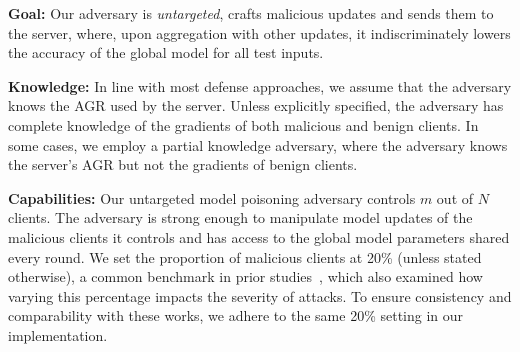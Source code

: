 \noindent\textbf{Goal:}
Our adversary is \emph{untargeted}, crafts malicious updates and sends them to the server, where, upon aggregation with other updates, it indiscriminately lowers the accuracy of the global model for all test inputs.



\noindent\textbf{Knowledge:} In line with most defense approaches, we assume that the adversary knows the AGR used by the server.
Unless explicitly specified, the adversary has complete knowledge of the gradients of both malicious and benign clients. In some cases, we employ a partial knowledge adversary, where the adversary knows the server's AGR but not the gradients of benign clients.

\noindent\textbf{Capabilities:} Our untargeted model poisoning adversary controls $m$ out of $N$ clients. The adversary is strong enough to manipulate model updates of the malicious clients it controls and has access to the global model parameters shared every round. 
We set the proportion of malicious clients at 20\% (unless stated otherwise), a common benchmark in prior studies~\cite{shejwalkar2021manipulating, fang2020local, cao2020fltrust, cao2022fedrecover}, which also examined how varying this percentage impacts the severity of attacks. To ensure consistency and comparability with these works, we adhere to the same 20\% setting in our implementation.


 


